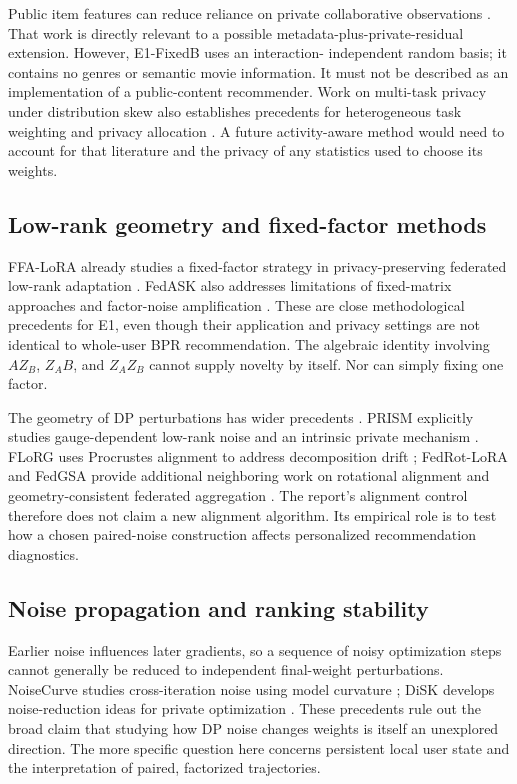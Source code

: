 Public item features can reduce reliance on private collaborative observations
\citep{curmei2023publicfeatures}. That work is directly relevant to a possible
metadata-plus-private-residual extension. However, E1-FixedB uses an interaction-
independent random basis; it contains no genres or semantic movie information.
It must not be described as an implementation of a public-content recommender.
Work on multi-task privacy under distribution skew also establishes precedents
for heterogeneous task weighting and privacy allocation
\citep{krichene2023skew}. A future activity-aware method would need to account for
that literature and the privacy of any statistics used to choose its weights.

\subsection{Low-rank geometry and fixed-factor methods}
FFA-LoRA already studies a fixed-factor strategy in privacy-preserving federated
low-rank adaptation \citep{sun2024ffalora}. FedASK also addresses limitations of
fixed-matrix approaches and factor-noise amplification \citep{wen2025fedask}.
These are close methodological precedents for E1, even though their application
and privacy settings are not identical to whole-user BPR recommendation. The
algebraic identity involving $AZ_B$, $Z_AB$, and $Z_AZ_B$ cannot supply novelty
by itself. Nor can simply fixing one factor.

The geometry of DP perturbations has wider precedents
\citep{duan2025geodp}. PRISM explicitly studies gauge-dependent low-rank noise
and an intrinsic private mechanism \citep{wang2026prism}. FLoRG uses Procrustes
alignment to address decomposition drift \citep{meng2026florg}; FedRot-LoRA and
FedGSA provide additional neighboring work on rotational alignment and
geometry-consistent federated aggregation
\citep{zhang2026fedrot,zheng2026fedgsa}. The report's alignment control therefore
does not claim a new alignment algorithm. Its empirical role is to test how a
chosen paired-noise construction affects personalized recommendation diagnostics.

\subsection{Noise propagation and ranking stability}
Earlier noise influences later gradients, so a sequence of noisy optimization
steps cannot generally be reduced to independent final-weight perturbations.
NoiseCurve studies cross-iteration noise using model curvature
\citep{gu2025noisecurve}; DiSK develops noise-reduction ideas for private
optimization \citep{zhang2025disk}. These precedents rule out the broad claim
that studying how DP noise changes weights is itself an unexplored direction.
The more specific question here concerns persistent local user state and the
interpretation of paired, factorized trajectories.

